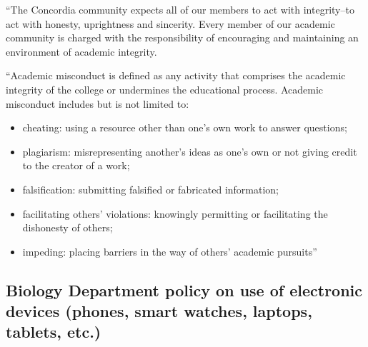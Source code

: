 \documentclass{tufte-handout}
\begin{document}
``The Concordia community expects all of our members to act with integrity--to act with honesty, uprightness and sincerity. Every member of our academic community is charged with the responsibility of encouraging and maintaining an environment of academic integrity.



``Academic misconduct is defined as any activity that comprises the academic integrity of the college or undermines the educational process. Academic misconduct includes but is not limited to:

\begin{itemize}
	\item cheating: using a resource other than one's own work to answer questions;
	\item plagiarism: misrepresenting another's ideas as one's own or not giving credit to the creator of a work;
	\item falsification: submitting falsified or fabricated information;
	\item facilitating others' violations: knowingly permitting or facilitating the dishonesty of others;
	\item impeding: placing barriers in the way of others' academic pursuits''
\end{itemize}



\subsection{Biology Department policy on use of electronic devices (phones, smart watches, laptops, tablets, etc.)}
\end{document}
